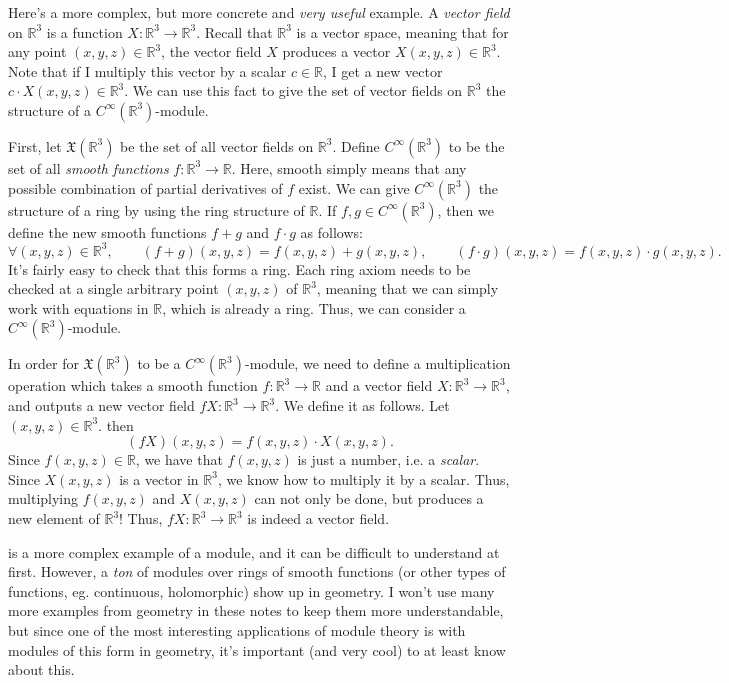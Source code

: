 \begin{example}\label{ex:module-4}
	Here's a more complex, but more concrete and \emph{very useful} example. A \emph{vector field} on $\mathbb{R} ^3$ is a function $X : \mathbb{R} ^3 \to \mathbb{R} ^3$. Recall that $\mathbb{R} ^3$ is a vector space, meaning that for any point $(x,y,z)\in\mathbb{R} ^3$, the vector field $X$ produces a vector $X(x,y,z)\in\mathbb{R} ^3$. Note that if I multiply this vector by a scalar $c\in\mathbb{R} $, I get a new vector $c\cdot X(x,y,z)\in\mathbb{R} ^3$. We can use this fact to give the set of vector fields on $\mathbb{R} ^3$ the structure of a $C^\infty (\mathbb{R} ^3)$-module.

	First, let $\mathfrak{X} (\mathbb{R} ^3)$ be the set of all vector fields on $\mathbb{R} ^3$. Define $C^\infty (\mathbb{R} ^3)$ to be the set of all \emph{smooth functions} $f : \mathbb{R} ^3 \to \mathbb{R} $. Here, smooth simply means that any possible combination of partial derivatives of $f$ exist. We can give $C^\infty (\mathbb{R} ^3)$ the structure of a ring by using the ring structure of $\mathbb{R} $. If $f,g\in C^\infty (\mathbb{R} ^3)$, then we define the new smooth functions $f+g$ and $f\cdot g$ as follows:
	\[
		\forall (x,y,z)\in\mathbb{R} ^3,\qquad (f+g)(x,y,z) = f(x,y,z) + g(x,y,z),\qquad (f\cdot g)(x,y,z)=f(x,y,z)\cdot g(x,y,z)
	.\]
	It's fairly easy to check that this forms a ring. Each ring axiom needs to be checked at a single arbitrary point $(x,y,z)$ of $\mathbb{R} ^3$, meaning that we can simply work with equations in $\mathbb{R} $, which is already a ring. Thus, we can consider a $C^\infty (\mathbb{R} ^3)$-module.

	In order for $\mathfrak{X} (\mathbb{R} ^3)$ to be a $C^\infty (\mathbb{R} ^3)$-module, we need to define a multiplication operation which takes a smooth function $f : \mathbb{R} ^3 \to \mathbb{R} $ and a vector field $X : \mathbb{R} ^3 \to \mathbb{R} ^3$, and outputs a new vector field $fX : \mathbb{R} ^3 \to \mathbb{R} ^3$. We define it as follows. Let $(x,y,z)\in\mathbb{R} ^3$. then
	\[
		(fX)(x,y,z) = f(x,y,z)\cdot X(x,y,z)
	.\]
	Since $f(x,y,z)\in\mathbb{R} $, we have that $f(x,y,z)$ is just a number, i.e. a \emph{scalar}. Since $X(x,y,z)$ is a vector in $\mathbb{R} ^3$, we know how to multiply it by a scalar. Thus, multiplying $f(x,y,z)$ and $X(x,y,z)$ can not only be done, but produces a new element of $\mathbb{R} ^3$! Thus, $fX : \mathbb{R} ^3 \to \mathbb{R} ^3$ is indeed a vector field.
\end{example}

 is a more complex example of a module, and it can be difficult to understand at first. However, a \emph{ton} of modules over rings of smooth functions (or other types of functions, eg. continuous, holomorphic) show up in geometry. I won't use many more examples from geometry in these notes to keep them more understandable, but since one of the most interesting applications of module theory is with modules of this form in geometry, it's important (and very cool) to at least know about this.
